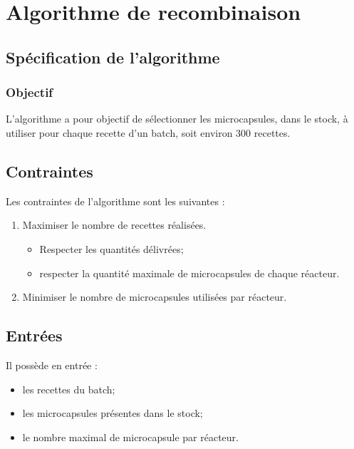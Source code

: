 \section{Algorithme de recombinaison}
\subsection{Spécification de l'algorithme}
\subsubsection*{Objectif}
L'algorithme a pour objectif de sélectionner les microcapsules, dans le stock, à utiliser pour chaque recette d'un batch, soit environ $300$ recettes.

\subsection*{Contraintes}
Les contraintes de l'algorithme sont les suivantes : 
\begin{enumerate}
    \item Maximiser le nombre de recettes réalisées.
    \begin{itemize}
        \item Respecter les quantités délivrées;
        \item respecter la quantité maximale de microcapsules de chaque réacteur.
    \end{itemize}    
    \item Minimiser le nombre de microcapsules utilisées par réacteur.
\end{enumerate}
\subsection*{Entrées}
Il possède en entrée : 
\begin{itemize}
    \item les recettes du batch;
    \item les microcapsules présentes dans le stock;
    \item le nombre maximal de microcapsule par réacteur.
\end{itemize}

